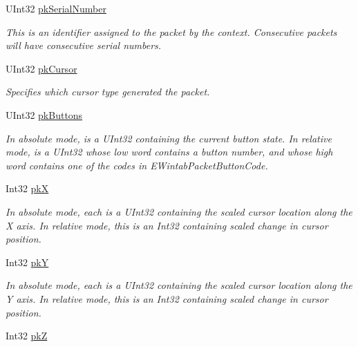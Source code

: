 \begin{DoxyCompactItemize}
UInt32 \hyperlink{struct_wintab_d_n_1_1_wintab_packet_a10550807dd2a1cd432c2ff3c271bd3ea}{pkSerialNumber}
\begin{DoxyCompactList}\small\item\em This is an identifier assigned to the packet by the context. Consecutive packets will have consecutive serial numbers. \item\end{DoxyCompactList}\item 
UInt32 \hyperlink{struct_wintab_d_n_1_1_wintab_packet_afb9d197243879d81f43b1aaa482507ef}{pkCursor}
\begin{DoxyCompactList}\small\item\em Specifies which cursor type generated the packet. \item\end{DoxyCompactList}\item 
UInt32 \hyperlink{struct_wintab_d_n_1_1_wintab_packet_a069d68ce089ae275eb30fd4b2746ad97}{pkButtons}
\begin{DoxyCompactList}\small\item\em In absolute mode, is a UInt32 containing the current button state. In relative mode, is a UInt32 whose low word contains a button number, and whose high word contains one of the codes in EWintabPacketButtonCode. \item\end{DoxyCompactList}\item 
Int32 \hyperlink{struct_wintab_d_n_1_1_wintab_packet_aa0986c51cb8c47d6eeaf1d0ec81335d0}{pkX}
\begin{DoxyCompactList}\small\item\em In absolute mode, each is a UInt32 containing the scaled cursor location along the X axis. In relative mode, this is an Int32 containing scaled change in cursor position. \item\end{DoxyCompactList}\item 
Int32 \hyperlink{struct_wintab_d_n_1_1_wintab_packet_ab3bd9cbd554397abd270d9c40fc1f34e}{pkY}
\begin{DoxyCompactList}\small\item\em In absolute mode, each is a UInt32 containing the scaled cursor location along the Y axis. In relative mode, this is an Int32 containing scaled change in cursor position. \item\end{DoxyCompactList}\item 
Int32 \hyperlink{struct_wintab_d_n_1_1_wintab_packet_ac5525a22d05a0a38e4522d9abbd91bb2}{pkZ}

\end{DoxyCompactItemize}
